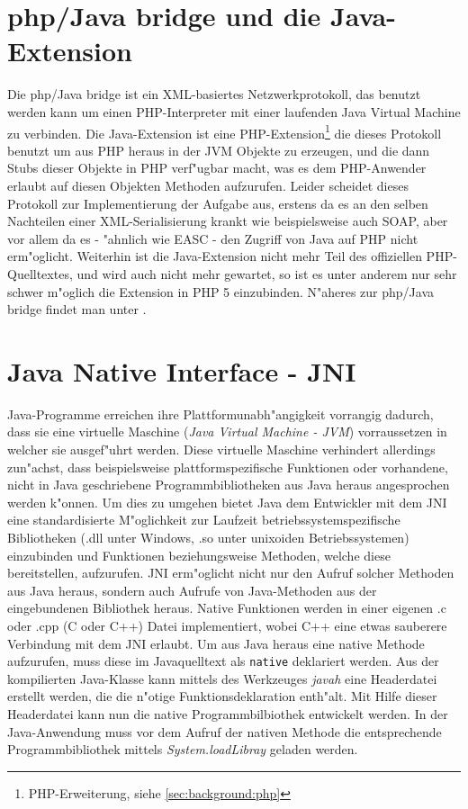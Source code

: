 \section{php/Java bridge und die Java-Extension}
\label{sec:background:bridge}
Die php/Java bridge ist ein XML-basiertes Netzwerkprotokoll, das benutzt werden kann um einen PHP-Interpreter mit einer laufenden Java Virtual Machine
zu verbinden.
Die Java-Extension ist eine PHP-Extension\footnote{PHP-Erweiterung, siehe \ref{sec:background:php}} die dieses Protokoll benutzt um aus PHP heraus
in der JVM Objekte zu erzeugen, und die dann Stubs dieser Objekte in PHP verf"ugbar macht, was es dem PHP-Anwender erlaubt auf diesen Objekten
Methoden aufzurufen. Leider scheidet dieses Protokoll zur Implementierung der Aufgabe aus, erstens da es an den selben Nachteilen einer XML-Serialisierung
krankt wie beispielsweise auch SOAP, aber vor allem da es - "ahnlich wie EASC - den Zugriff von Java auf PHP nicht erm"oglicht. Weiterhin ist die
Java-Extension nicht mehr Teil des offiziellen PHP-Quelltextes, und wird auch nicht mehr gewartet, so ist es unter anderem nur sehr schwer
m"oglich die Extension in PHP 5 einzubinden.
N"aheres zur php/Java bridge findet man unter \cite{BRIDGEHP}.

\section{Java Native Interface - JNI}
\label{sec:background:JNI}

Java-Programme erreichen ihre Plattformunabh"angigkeit vorrangig dadurch, dass sie eine virtuelle Maschine (\emph{Java Virtual Machine - JVM}) vorraussetzen in welcher sie
ausgef"uhrt werden. Diese virtuelle Maschine verhindert allerdings zun"achst, dass beispielsweise plattformspezifische Funktionen oder vorhandene, nicht in Java
geschriebene Programmbibliotheken aus Java heraus angesprochen werden k"onnen.
Um dies zu umgehen bietet Java dem Entwickler mit dem JNI eine standardisierte M"oglichkeit zur Laufzeit betriebssystemspezifische Bibliotheken 
(.dll unter Windows, .so unter unixoiden Betriebssystemen) einzubinden und Funktionen beziehungsweise Methoden, welche diese bereitstellen, aufzurufen. 
JNI erm"oglicht nicht nur den Aufruf solcher Methoden aus Java heraus, sondern auch Aufrufe von Java-Methoden aus der eingebundenen Bibliothek heraus.
Native Funktionen werden in einer eigenen .c oder .cpp (C oder C++) Datei implementiert, wobei C++ eine etwas sauberere Verbindung mit dem JNI erlaubt.
Um aus Java heraus eine native Methode aufzurufen, muss diese im Javaquelltext als \texttt{native} deklariert werden. Aus der kompilierten Java-Klasse kann
mittels des Werkzeuges \emph{javah} eine Headerdatei erstellt werden, die die n"otige Funktionsdeklaration enth"alt. Mit Hilfe dieser Headerdatei kann
nun die native Programmbilbiothek entwickelt werden.
In der Java-Anwendung muss vor dem Aufruf der nativen Methode die entsprechende Programmbibliothek mittels \emph{System.loadLibray} geladen werden.

